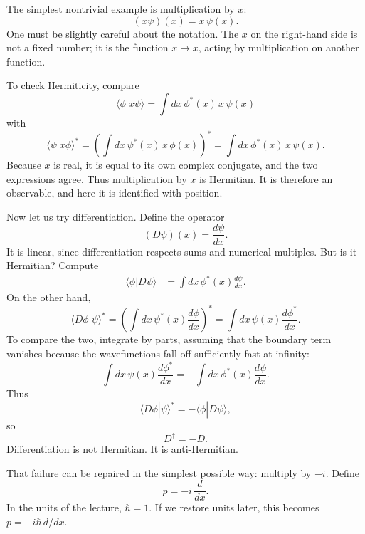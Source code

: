 The simplest nontrivial example is multiplication by \(x\):
\begin{equation}
(x\psi)(x)=x\,\psi(x).
\end{equation}
One must be slightly careful about the notation. The \(x\) on the right-hand side is not a fixed number; it is the function \(x\mapsto x\), acting by multiplication on another function.

To check Hermiticity, compare
\begin{equation}
\langle \phi|x\psi\rangle=\int dx\,\phi^*(x)\,x\,\psi(x)
\end{equation}
with
\begin{equation}
\langle \psi|x\phi\rangle^*
=
\left(\int dx\,\psi^*(x)\,x\,\phi(x)\right)^*
=
\int dx\,\phi^*(x)\,x\,\psi(x).
\end{equation}
Because \(x\) is real, it is equal to its own complex conjugate, and the two expressions agree. Thus multiplication by \(x\) is Hermitian. It is therefore an observable, and here it is identified with position.

Now let us try differentiation. Define the operator
\begin{equation}
(D\psi)(x)=\frac{d\psi}{dx}.
\end{equation}
It is linear, since differentiation respects sums and numerical multiples. But is it Hermitian? Compute
\begin{align}
\langle \phi|D\psi\rangle
&=\int dx\,\phi^*(x)\frac{d\psi}{dx}.
\end{align}
On the other hand,
\begin{equation}
\langle D\phi|\psi\rangle^*
=
\left(\int dx\,\psi^*(x)\frac{d\phi}{dx}\right)^*
=
\int dx\,\psi(x)\frac{d\phi^*}{dx}.
\end{equation}
To compare the two, integrate by parts, assuming that the boundary term vanishes because the wavefunctions fall off sufficiently fast at infinity:
\begin{equation}
\int dx\,\psi(x)\frac{d\phi^*}{dx}
=
-\int dx\,\phi^*(x)\frac{d\psi}{dx}.
\end{equation}
Thus
\begin{equation}
\langle D\phi|\psi\rangle^*=-\langle \phi|D\psi\rangle,
\end{equation}
so
\begin{equation}
D^\dagger=-D.
\end{equation}
Differentiation is not Hermitian. It is anti-Hermitian.

That failure can be repaired in the simplest possible way: multiply by \(-i\). Define
\begin{equation}
p=-i\,\frac{d}{dx}.
\end{equation}
In the units of the lecture, \(\hbar=1\). If we restore units later, this becomes \(p=-i\hbar\,d/dx\).

